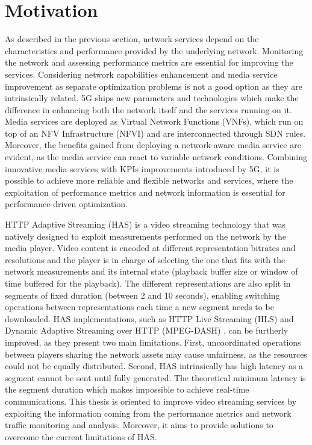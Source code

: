 \section{Motivation}

As described in the previous section, network services depend on the characteristics and performance provided by the underlying network. Monitoring the network and assessing performance metrics are essential for improving the services.
Considering network capabilities enhancement and media service improvement as separate optimization problems is not a good option as they are intrinsically related.
5G ships new parameters and technologies which make the difference in enhancing both the network itself and the services running on it. Media services are deployed as Virtual Network Functions (VNFs), which run on top of an NFV Infrastructure (NFVI) and are interconnected through SDN rules.
Moreover, the benefits gained from deploying a network-aware media service are evident, as the media service can react to variable network conditions. Combining innovative media services with KPIs improvements introduced by 5G, it is possible to achieve more reliable and flexible networks and services, where the exploitation of performance metrics and network information is essential for performance-driven optimization.

HTTP Adaptive Streaming (HAS) \cite{Seufert2014} is a video streaming technology that was natively designed to exploit measurements performed on the network by the media player. Video content is encoded at different representation bitrates and resolutions and the player is in charge of selecting the one that fits with the network measurements and its internal state (playback buffer size or window of time buffered for the playback). The different representations are also split in segments of fixed duration (between 2 and 10 seconds), enabling switching operations between representations each time a new segment needs to be downloaded.
HAS implementations, such as HTTP Live Streaming (HLS) \cite{hls2017} and Dynamic Adaptive Streaming over HTTP (MPEG-DASH) \cite{sodagar2011mpeg}, can be furtherly improved, as they present two main limitations. First, uncoordinated operations between players sharing the network assets may cause unfairness, as the resources could not be equally distributed. Second, HAS intrinsically has high latency as a segment cannot be sent until fully generated. The theoretical minimum latency is the segment duration which makes impossible to achieve real-time communications.
This thesis is oriented to improve video streaming services by exploiting the information coming from the performance metrics and network traffic monitoring and analysis. Moreover, it aims to provide solutions to overcome the current limitations of HAS.

